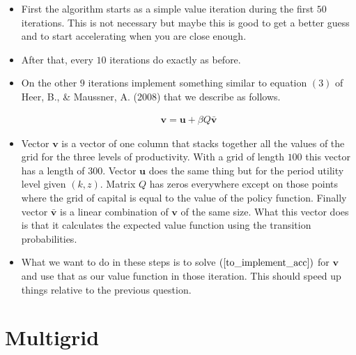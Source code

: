 \documentclass[a4paper,12pt]{article}
\begin{document}
    \begin{itemize}
        \item First the algorithm starts as a simple value iteration during the first $50$ iterations. This is not necessary but maybe this is good to get a better guess and to start accelerating when you are close enough. 
        
        \item After that, every $10$ iterations do exactly as before. 
        
        \item On the other $9$ iterations implement something similar to equation $(3)$ of Heer, B., \& Maussner, A. (2008) that we describe as follows. 
        
        \begin{align}\label{to_implement_acc}
            \mathbf{v} = \mathbf{u} + \beta Q \bar{\mathbf{v}}
        \end{align}
        
        \item Vector $\mathbf{v}$ is a vector of one column that stacks together all the values of the grid for the three levels of productivity. With a grid of length $100$ this vector has a length of $300$. Vector $\mathbf{u}$ does the same thing but for the period utility level given $(k,z)$. Matrix $Q$ has zeros everywhere except on those points where the grid of capital is equal to the value of the policy function. Finally vector $\bar{\mathbf{v}}$ is a linear combination of $\mathbf{v}$ of the same size. What this vector does is that it calculates the expected value function using the transition probabilities. 
        
        \item What we want to do in these steps is to solve $(\ref{to_implement_acc})$ for $\mathbf{v}$ and use that as our value function in those iteration. This should speed up things relative to the previous question. 
    \end{itemize}    
    
    \medskip
    \medskip
    \section{Multigrid}     
    \medskip
    
    
\end{document}
